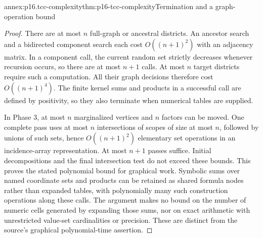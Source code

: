 \begin{annexitem}{annex:p16.tcc-complexity}{thm:p16-tcc-complexity}{Termination and a graph-operation bound}
\begin{proof}
There are at most \(n\) full-graph or ancestral districts.
An ancestor search and a bidirected component search each cost
\(O((n+1)^2)\) with an adjacency matrix. In a component call,
the current random set strictly decreases whenever recursion occurs,
so there are at most \(n+1\) calls. At most \(n\) target
districts require such a computation. All their graph decisions
therefore cost \(O((n+1)^4)\). The finite kernel sums and
products in a successful call are defined by positivity, so they
also terminate when numerical tables are supplied.

In Phase 3, at most \(n\) marginalized vertices and \(n\)
factors can be moved. One complete pass uses at most \(n\)
intersections of scopes of size at most \(n\), followed by
unions of such sets, hence \(O((n+1)^2)\) elementary set
operations in an incidence-array representation. At most \(n+1\)
passes suffice. Initial decompositions and the final intersection
test do not exceed these bounds. This proves the stated polynomial
bound for graphical work. Symbolic sums over named coordinate
sets and products can be retained as shared formula nodes rather
than expanded tables, with polynomially many such construction
operations along these calls. The argument makes no bound on
the number of numeric cells generated by expanding those sums,
nor on exact arithmetic with unrestricted value-set cardinalities
or precision. These are distinct from the source's graphical
polynomial-time assertion.
\end{proof}
\end{annexitem}

